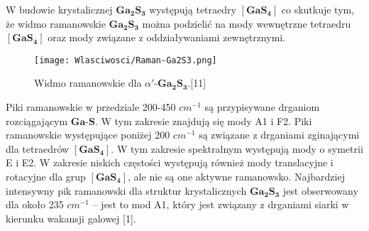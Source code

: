 W budowie krystalicznej $\mathbf{Ga_{2}S_{3}}$ występują tetraedry $[\mathbf{GaS_{4}}]$ co skutkuje tym, że widmo ramanowskie $\mathbf{Ga_{2}S_{3}}$ można podzielić na mody wewnętrzne tetraedru $[\mathbf{GaS_{4}}]$ oraz mody związane
z oddziaływaniami zewnętrznymi.


\begin{figure}[H]
	\begin{center}
		\texttt{[image: Wlasciwosci/Raman-Ga2S3.png]}
		\caption{Widmo ramanowskie dla $\alpha'$-$\mathbf{Ga_{2}S_{3}}$.[11]}
	\end{center}
\end{figure}

Piki ramanowskie w przedziale 200-450 $cm^{-1}$ są przypisywane drganiom rozciągającym $\mathbf{Ga}$-$\mathbf{S}$. W tym zakresie znajdują się mody A1 i F2. Piki ramanowskie występujące poniżej 200 $cm^{-1}$ są związane z drganiami zginającymi dla tetraedrów $[\mathbf{GaS_{4}}]$. 
W tym zakresie spektralnym występują mody o symetrii E i E2. W zakresie niskich częstości występują również mody translacyjne i rotacyjne dla grup $[\mathbf{GaS_{4}}]$, ale nie są one aktywne ramanowsko. Najbardziej intensywny pik ramanowski dla struktur krystalicznych $\mathbf{Ga_{2}S_{3}}$ jest obserwowany dla około 235 $cm^{-1}$ – jest to mod A1, który jest związany z drganiami siarki w kierunku wakansji galowej [1].





